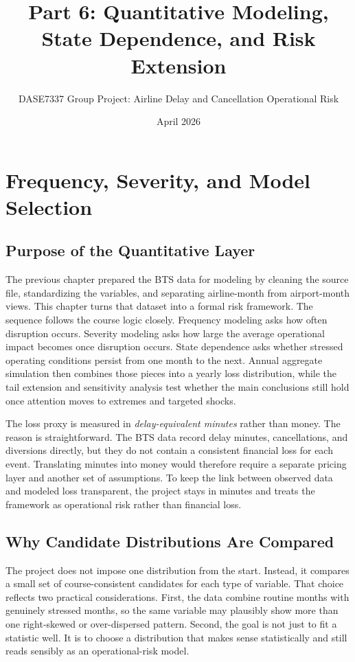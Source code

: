 \documentclass[11pt]{article}
\title{\textbf{Part 6: Quantitative Modeling, State Dependence, and Risk Extension}}
\author{DASE7337 Group Project: Airline Delay and Cancellation Operational Risk}
\date{April 2026}
\begin{document}
\maketitle

\setcounter{section}{5}

\section{Frequency, Severity, and Model Selection}

\subsection{Purpose of the Quantitative Layer}
The previous chapter prepared the BTS data for modeling by cleaning the source file, standardizing the variables, and separating airline-month from airport-month views. This chapter turns that dataset into a formal risk framework. The sequence follows the course logic closely. Frequency modeling asks how often disruption occurs. Severity modeling asks how large the average operational impact becomes once disruption occurs. State dependence asks whether stressed operating conditions persist from one month to the next. Annual aggregate simulation then combines those pieces into a yearly loss distribution, while the tail extension and sensitivity analysis test whether the main conclusions still hold once attention moves to extremes and targeted shocks.

The loss proxy is measured in \textit{delay-equivalent minutes} rather than money. The reason is straightforward. The BTS data record delay minutes, cancellations, and diversions directly, but they do not contain a consistent financial loss for each event. Translating minutes into money would therefore require a separate pricing layer and another set of assumptions. To keep the link between observed data and modeled loss transparent, the project stays in minutes and treats the framework as operational risk rather than financial loss.

\subsection{Why Candidate Distributions Are Compared}
The project does not impose one distribution from the start. Instead, it compares a small set of course-consistent candidates for each type of variable. That choice reflects two practical considerations. First, the data combine routine months with genuinely stressed months, so the same variable may plausibly show more than one right-skewed or over-dispersed pattern. Second, the goal is not just to fit a statistic well. It is to choose a distribution that makes sense statistically and still reads sensibly as an operational-risk model.
\end{document}
